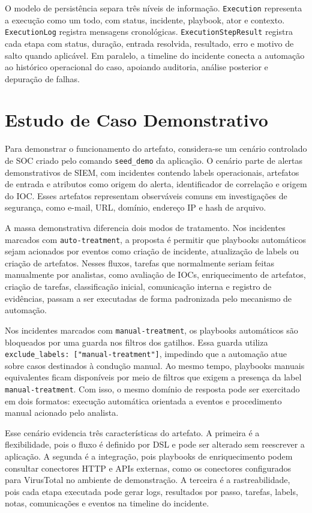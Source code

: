 \documentclass[article,a4paper,12pt,english,brazil,sumario=tradicional]{abntex2}
\begin{document}
O modelo de persistência separa três níveis de informação. \texttt{Execution} representa a execução como um todo, com status, incidente, playbook, ator e contexto. \texttt{ExecutionLog} registra mensagens cronológicas. \texttt{ExecutionStepResult} registra cada etapa com status, duração, entrada resolvida, resultado, erro e motivo de salto quando aplicável. Em paralelo, a timeline do incidente conecta a automação ao histórico operacional do caso, apoiando auditoria, análise posterior e depuração de falhas.

\section{Estudo de Caso Demonstrativo}

Para demonstrar o funcionamento do artefato, considera-se um cenário controlado de SOC criado pelo comando \texttt{seed\_demo} da aplicação. O cenário parte de alertas demonstrativos de SIEM, com incidentes contendo labels operacionais, artefatos de entrada e atributos como origem do alerta, identificador de correlação e origem do IOC. Esses artefatos representam observáveis comuns em investigações de segurança, como e-mail, URL, domínio, endereço IP e hash de arquivo.

A massa demonstrativa diferencia dois modos de tratamento. Nos incidentes marcados com \texttt{auto-treatment}, a proposta é permitir que playbooks automáticos sejam acionados por eventos como criação de incidente, atualização de labels ou criação de artefatos. Nesses fluxos, tarefas que normalmente seriam feitas manualmente por analistas, como avaliação de IOCs, enriquecimento de artefatos, criação de tarefas, classificação inicial, comunicação interna e registro de evidências, passam a ser executadas de forma padronizada pelo mecanismo de automação.

Nos incidentes marcados com \texttt{manual-treatment}, os playbooks automáticos são bloqueados por uma guarda nos filtros dos gatilhos. Essa guarda utiliza \texttt{exclude\_labels: ["manual-treatment"]}, impedindo que a automação atue sobre casos destinados à condução manual. Ao mesmo tempo, playbooks manuais equivalentes ficam disponíveis por meio de filtros que exigem a presença da label \texttt{manual-treatment}. Com isso, o mesmo domínio de resposta pode ser exercitado em dois formatos: execução automática orientada a eventos e procedimento manual acionado pelo analista.

Esse cenário evidencia três características do artefato. A primeira é a flexibilidade, pois o fluxo é definido por DSL e pode ser alterado sem reescrever a aplicação. A segunda é a integração, pois playbooks de enriquecimento podem consultar conectores HTTP e APIs externas, como os conectores configurados para VirusTotal no ambiente de demonstração. A terceira é a rastreabilidade, pois cada etapa executada pode gerar logs, resultados por passo, tarefas, labels, notas, comunicações e eventos na timeline do incidente.
\end{document}
